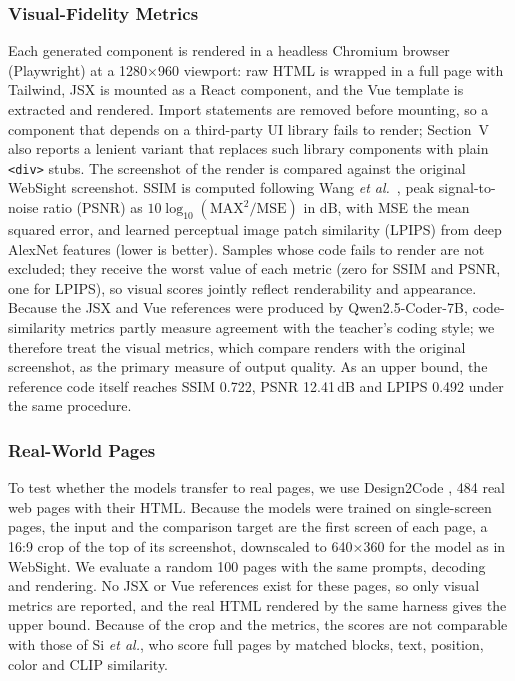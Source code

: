 \documentclass[conference,a4paper]{IEEEtran}
\begin{document}
\subsubsection{Visual-Fidelity Metrics}
Each generated component is rendered in a headless Chromium browser
(Playwright) at a 1280$\times$960 viewport: raw HTML is wrapped in a full page
with Tailwind, JSX is mounted as a React component, and the Vue template is
extracted and rendered. Import statements are removed before mounting, so a
component that depends on a third-party UI library fails to render; Section~V
also reports a lenient variant that replaces such library components with plain
\texttt{<div>} stubs. The screenshot of the render is compared against the
original WebSight screenshot. SSIM is computed following
Wang \textit{et al.}~\cite{wang2004ssim}, peak signal-to-noise ratio (PSNR) as
$10\log_{10}(\mathrm{MAX}^2/\mathrm{MSE})$ in dB, with MSE the mean squared error, and
learned perceptual image patch similarity (LPIPS) \cite{zhang2018lpips} from deep AlexNet features (lower is better). Samples whose
code fails to render are not excluded; they receive the worst value of each
metric (zero for SSIM and PSNR, one for LPIPS), so visual scores jointly
reflect renderability and appearance. Because the JSX and Vue references were
produced by Qwen2.5-Coder-7B, code-similarity metrics partly measure agreement
with the teacher's coding style; we therefore treat the visual metrics, which
compare renders with the original screenshot, as the primary measure of output
quality. As an upper bound, the reference code itself reaches SSIM 0.722, PSNR
12.41\,dB and LPIPS 0.492 under the same procedure.

\subsubsection{Real-World Pages}
To test whether the models transfer to real pages, we use Design2Code
\cite{si2025design2code}, 484 real web pages with their HTML. Because the
models were trained on single-screen pages, the input and the comparison target
are the first screen of each page, a 16:9 crop of the top of its screenshot,
downscaled to 640$\times$360 for the model as in WebSight. We evaluate a random
100 pages with the same prompts, decoding and rendering. No JSX or Vue
references exist for these pages, so only visual metrics are reported, and the
real HTML rendered by the same harness gives the upper bound. Because of the crop
and the metrics, the scores are not comparable with those of Si \textit{et al.},
who score full pages by matched blocks, text, position, color and CLIP similarity.
\end{document}
